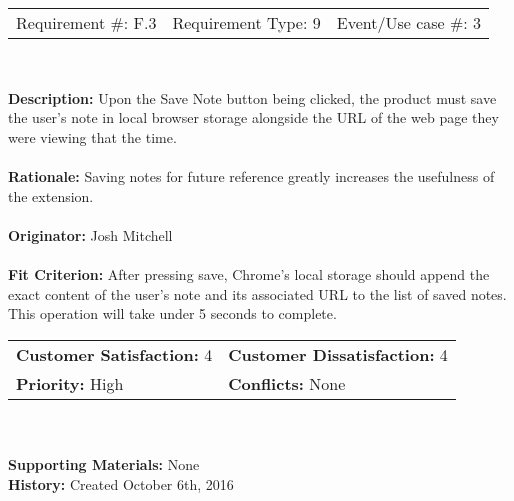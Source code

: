 \documentclass[12pt, titlepage]{article}
\begin{document}
\begin{framed}
	
	\begin{center}
		
		\begin{tabular}{ l c r }
			Requirement \#: F.3 & Requirement Type: 9 & Event/Use case \#: 3\\
		\end{tabular} \\
	\end{center}
	\textbf{Description:} Upon the Save Note button being clicked, the product 
	must save the user's note in local browser storage alongside the URL of the 
	web page they were viewing that the time. \\
	\\
	\textbf{Rationale:} Saving notes for future reference greatly increases the 
	usefulness of the extension. \\
	\\
	\textbf{Originator:} Josh Mitchell \\
	\\
	\textbf{Fit Criterion:} After pressing save, Chrome's local storage should 
	append the exact content of the user's note and its associated URL to the 
	list of saved notes. This operation will take under 5 seconds to complete. 
	\\
	
	\begin{tabular}{ll}
		\textbf{Customer Satisfaction:} 4 & \textbf{Customer Dissatisfaction:} 
		4 \\
		\textbf{Priority:} High & \textbf{Conflicts:} None\\
	\end{tabular} \\
	\\
	\textbf{Supporting Materials:} None \\
	\textbf{History:} Created October 6th, 2016
	
\end{framed}
\end{document}
